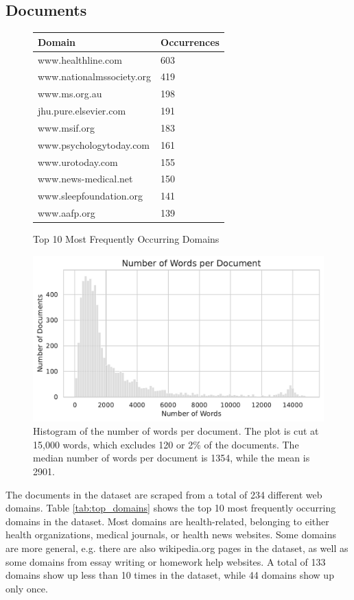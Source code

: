 \subsection{Documents}
\begin{figure}
\centering
   \begin{minipage}{\textwidth}
        \centering
        \begin{tabular}{ll}
        \hline
        \textbf{Domain} & \textbf{Occurrences} \\
        \hline
        www.healthline.com & 603 \\
        www.nationalmssociety.org & 419 \\
        www.ms.org.au & 198 \\
        jhu.pure.elsevier.com & 191 \\
        www.msif.org & 183 \\
        www.psychologytoday.com & 161 \\
        www.urotoday.com & 155 \\
        www.news-medical.net & 150 \\
        www.sleepfoundation.org & 141 \\
        www.aafp.org & 139 \\
        \hline
        \end{tabular}
        \caption{Top 10 Most Frequently Occurring Domains}
        \label{tab:top_domains}
   \end{minipage} 
   \begin{minipage}{\textwidth}
        \includegraphics[width=\textwidth]{images/num_words_per_passage.pdf}
        \caption{Histogram of the number of words per document. The plot is cut at 15,000 words, which excludes 120 or 2\% of the documents. The median number of words per document is 1354, while the mean is 2901.}
        \label{fig:num_words_per_document}
   \end{minipage}
\end{figure}
The documents in the dataset are scraped from a total of 234 different web domains.
Table \ref{tab:top_domains} shows the top 10 most frequently occurring domains in the dataset.
Most domains are health-related, belonging to either health organizations, medical journals, or health news websites.
Some domains are more general, e.g. there are also wikipedia.org pages in the dataset, as well as some domains from essay writing or homework help websites.
A total of 133 domains show up less than 10 times in the dataset, while 44 domains show up only once.

